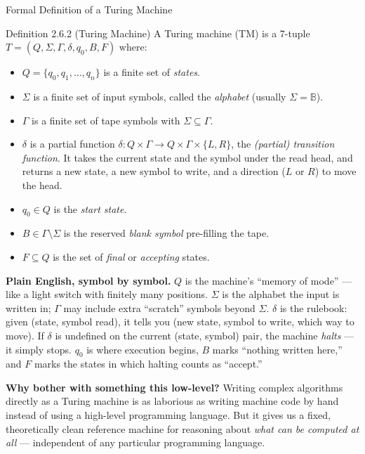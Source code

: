\documentclass[aspectratio=169,10pt]{beamer}
\newcommand{\B}{\mathbb{B}}
\begin{document}
\begin{frame}[allowframebreaks]{Formal Definition of a Turing Machine}
  \begin{block}{Definition 2.6.2 (Turing Machine)}
    A Turing machine (TM) is a 7-tuple $T = (Q, \Sigma, \Gamma, \delta, q_0, B, F)$
    where:
    \begin{itemize}
      \item $Q = \{q_0, q_1, \dots, q_n\}$ is a finite set of \emph{states}.
      \item $\Sigma$ is a finite set of input symbols, called the
        \emph{alphabet} (usually $\Sigma = \B$).
      \item $\Gamma$ is a finite set of tape symbols with $\Sigma \subseteq \Gamma$.
      \item $\delta$ is a partial function
        $\delta : Q \times \Gamma \to Q \times \Gamma \times \{L, R\}$, the
        \emph{(partial) transition function}. It takes the current state and
        the symbol under the read head, and returns a new state, a new symbol
        to write, and a direction ($L$ or $R$) to move the head.
      \item $q_0 \in Q$ is the \emph{start state}.
      \item $B \in \Gamma \setminus \Sigma$ is the reserved \emph{blank symbol}
        pre-filling the tape.
      \item $F \subseteq Q$ is the set of \emph{final} or \emph{accepting}
        states.
    \end{itemize}
  \end{block}

  \textbf{Plain English, symbol by symbol.} $Q$ is the machine's ``memory of
  mode'' --- like a light switch with finitely many positions. $\Sigma$ is the
  alphabet the input is written in; $\Gamma$ may include extra ``scratch''
  symbols beyond $\Sigma$. $\delta$ is the rulebook: given (state, symbol
  read), it tells you (new state, symbol to write, which way to move). If
  $\delta$ is undefined on the current (state, symbol) pair, the machine
  \emph{halts} --- it simply stops. $q_0$ is where execution begins, $B$ marks
  ``nothing written here,'' and $F$ marks the states in which halting counts as
  ``accept.''

  \framebreak

  \textbf{Why bother with something this low-level?} Writing complex algorithms
  directly as a Turing machine is as laborious as writing machine code by hand
  instead of using a high-level programming language. But it gives us a fixed,
  theoretically clean reference machine for reasoning about \emph{what can be
  computed at all} --- independent of any particular programming language.


\end{frame}
\end{document}
